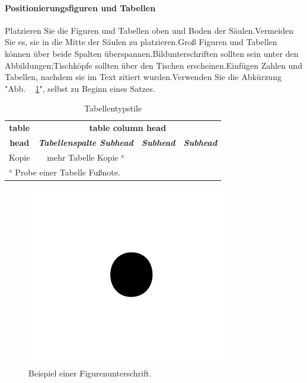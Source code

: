 \documentclass[conference]{IEEEtran}
\begin{document}
\paragraph{Positionierungsfiguren und Tabellen} Platzieren Sie die Figuren und Tabellen oben und
Boden der Säulen.Vermeiden Sie es, sie in die Mitte der Säulen zu platzieren.Groß
Figuren und Tabellen können über beide Spalten überspannen.Bildunterschriften sollten sein
unter den Abbildungen;Tischköpfe sollten über den Tischen erscheinen.Einfügen
Zahlen und Tabellen, nachdem sie im Text zitiert wurden.Verwenden Sie die Abkürzung
"Abb. ~ \ref{fig}", selbst zu Beginn eines Satzes.\begin{table}[htbp]
\caption{Tabellentypstile}
\begin{center}
\begin{tabular}{|c|c|c|c|}
\hline
\textbf{table} & \multicolumn{3}{|c|}{\textbf{table column head}} \\
\cline{2-4}
\textbf{head} & \textbf{\textit{Tabellenspalte Subhead}} & \textbf{\textit{Subhead}} & \textbf{\textit{Subhead}} \\
\hline
Kopie & mehr Tabelle Kopie $^{\mathrm{a}}$ & \\
\hline
\multicolumn{4}{l}{$^{\mathrm{a}}$ Probe einer Tabelle Fußnote.} \end{tabular}
\label{tab1}
\end{center}
\end{table}

\begin{figure}[htbp]
\centerline{\includegraphics{fig1.png}}
\caption{Beispiel einer Figurenunterschrift.} \label{fig}
\end{figure}
\end{document}
